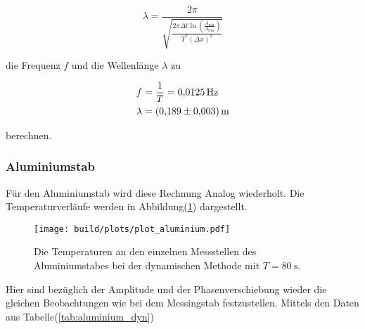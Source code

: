         \begin{equation*}
          \lambda = \frac{2\pi}{\sqrt{\frac{2 \pi \Delta t \ln\left(\frac{A_{\text{nah}}}{A_{\text{fern}}}\right)}{T^* (\Delta x)^2}}}
        \end{equation*}

        \noindent die Frequenz $f$ und die Wellenlänge $\lambda$ zu 

        \begin{align*}
          f &= \frac{1}{T} = \SI{0.0125}{\hertz}\\
          \lambda &= \SI{0.189 \pm 0.003}{\metre}
        \end{align*}

        \noindent berechnen.

      \subsubsection{Aluminiumstab}

        \noindent Für den Aluminiumstab wird diese Rechnung Analog wiederholt.
        Die Temperaturverläufe werden in Abbildung(\ref{fig:aluminium_dyn}) dargestellt.

        \begin{figure}[H]
          \centering
          \texttt{[image: build/plots/plot\_aluminium.pdf]}
          \caption{Die Temperaturen an den einzelnen Messstellen des Aluminiumstabes bei der dynamischen Methode mit $T=\SI{80}{\second}$.}
          \label{fig:aluminium_dyn}
        \end{figure}

        \noindent Hier sind bezüglich der Amplitude und der Phasenverschiebung wieder die gleichen Beobachtungen wie bei dem Messingstab 
        festzustellen.
        Mittels den Daten aus Tabelle(\ref{tab:aluminium_dyn})

